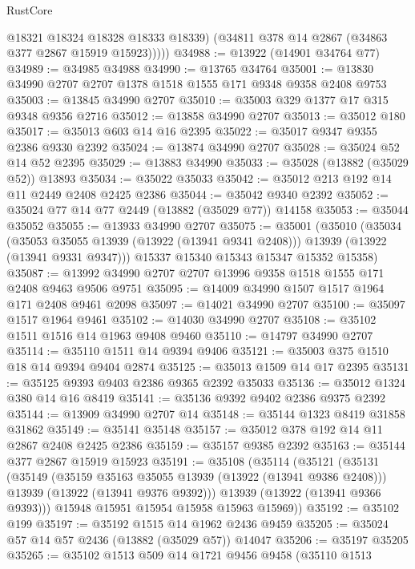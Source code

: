 \begin{lexlean}{RustCore}
\begin{coremodule}
            @18321
            @18324
            @18328
            @18333
            @18339)
          (@34811 @378 @14 @2867 (@34863 @377 @2867 @15919 @15923)))))
@34988 := @13922 (@14901 @34764 @77)
@34989 := @34985 @34988
@34990 := @13765 @34764
@35001 := @13830 @34990 @2707 @2707 @1378 @1518 @1555 @171 @9348 @9358 @2408 @9753
@35003 := @13845 @34990 @2707
@35010 := @35003 @329 @1377 @17 @315 @9348 @9356 @2716
@35012 := @13858 @34990 @2707
@35013 := @35012 @180
@35017 := @35013 @603 @14 @16 @2395
@35022 := @35017 @9347 @9355 @2386 @9330 @2392
@35024 := @13874 @34990 @2707
@35028 := @35024 @52 @14 @52 @2395
@35029 := @13883 @34990
@35033 := @35028 (@13882 (@35029 @52)) @13893
@35034 := @35022 @35033
@35042 := @35012 @213 @192 @14 @11 @2449 @2408 @2425 @2386
@35044 := @35042 @9340 @2392
@35052 := @35024 @77 @14 @77 @2449 (@13882 (@35029 @77)) @14158
@35053 := @35044 @35052
@35055 := @13933 @34990 @2707
@35075 := @35001
    (@35010
      (@35034
        (@35053 @35055 @13939 (@13922 (@13941 @9341 @2408)))
        @13939
        (@13922 (@13941 @9331 @9347)))
      @15337
      @15340
      @15343
      @15347
      @15352
      @15358)
@35087 := @13992 @34990 @2707 @2707 @13996 @9358 @1518 @1555 @171 @2408 @9463 @9506 @9751
@35095 := @14009 @34990 @1507 @1517 @1964 @171 @2408 @9461 @2098
@35097 := @14021 @34990 @2707
@35100 := @35097 @1517 @1964 @9461
@35102 := @14030 @34990 @2707
@35108 := @35102 @1511 @1516 @14 @1963 @9408 @9460
@35110 := @14797 @34990 @2707
@35114 := @35110 @1511 @14 @9394 @9406
@35121 := @35003 @375 @1510 @18 @14 @9394 @9404 @2874
@35125 := @35013 @1509 @14 @17 @2395
@35131 := @35125 @9393 @9403 @2386 @9365 @2392 @35033
@35136 := @35012 @1324 @380 @14 @16 @8419
@35141 := @35136 @9392 @9402 @2386 @9375 @2392
@35144 := @13909 @34990 @2707 @14
@35148 := @35144 @1323 @8419 @31858 @31862
@35149 := @35141 @35148
@35157 := @35012 @378 @192 @14 @11 @2867 @2408 @2425 @2386
@35159 := @35157 @9385 @2392
@35163 := @35144 @377 @2867 @15919 @15923
@35191 := @35108
    (@35114
      (@35121
        (@35131
          (@35149
            (@35159 @35163 @35055 @13939 (@13922 (@13941 @9386 @2408)))
            @13939
            (@13922 (@13941 @9376 @9392)))
          @13939
          (@13922 (@13941 @9366 @9393)))
        @15948
        @15951
        @15954
        @15958
        @15963
        @15969))
@35192 := @35102 @199
@35197 := @35192 @1515 @14 @1962 @2436 @9459
@35205 := @35024 @57 @14 @57 @2436 (@13882 (@35029 @57)) @14047
@35206 := @35197 @35205
@35265 := @35102
    @1513
    @509
    @14
    @1721
    @9456
    @9458
    (@35110
      @1513

\end{coremodule}
\end{lexlean}
